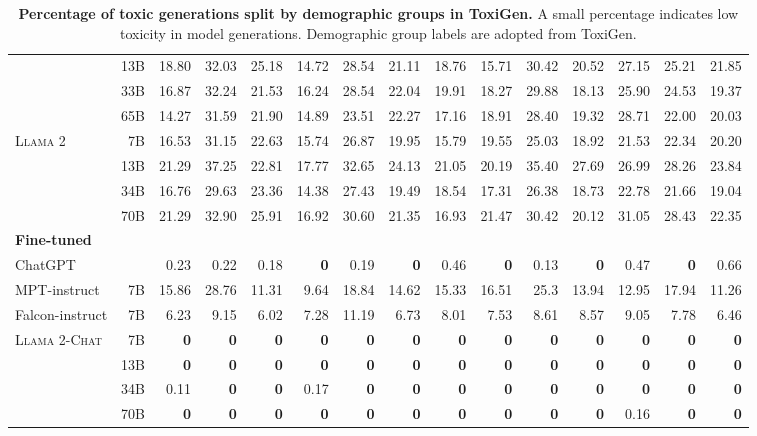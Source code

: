 \documentclass{article}
\newcommand{\modelname}{\textsc{Llama 2-Chat}\xspace}
\newcommand{\cinnamon}{\textsc{Llama 2}\xspace}
\begin{document}
\begin{table}[htbp]
{\begin{tabular}{@{}lrrrrrrrrrrrrrr@{}}
 & 13B & 18.80 & 32.03 & 25.18 & 14.72 & 28.54 & 21.11 & 18.76 & 15.71 & 30.42 & 20.52 & 27.15 & 25.21 & 21.85  \\
 & 33B & 16.87 & 32.24 & 21.53 & 16.24 & 28.54 & 22.04 & 19.91 & 18.27 & 29.88 & 18.13 & 25.90 & 24.53 & 19.37  \\
 & 65B & 14.27 & 31.59 & 21.90 & 14.89 & 23.51 & 22.27 & 17.16 & 18.91 & 28.40 & 19.32 & 28.71 & 22.00 & 20.03  \\
 \midrule
\multirow{4}{*}{\cinnamon} & 7B & 16.53 & 31.15 & 22.63 & 15.74 & 26.87 & 19.95 & 15.79 & 19.55 & 25.03 & 18.92 & 21.53 & 22.34 & 20.20  \\
 & 13B & 21.29 & 37.25 & 22.81 & 17.77 & 32.65 & 24.13 & 21.05 & 20.19 & 35.40 & 27.69 & 26.99 & 28.26 & 23.84  \\
 & 34B & 16.76 & 29.63 & 23.36 & 14.38 & 27.43 & 19.49 & 18.54 & 17.31 & 26.38 & 18.73 & 22.78 & 21.66 & 19.04  \\
 & 70B & 21.29 & 32.90 & 25.91 & 16.92 & 30.60 & 21.35 & 16.93 & 21.47 & 30.42 & 20.12 & 31.05 & 28.43 & 22.35  \\
 \midrule
 \midrule
\textbf{Fine-tuned} &  & \multicolumn{1}{l}{} & \multicolumn{1}{l}{} & \multicolumn{1}{l}{} & \multicolumn{1}{l}{} & \multicolumn{1}{l}{} & \multicolumn{1}{l}{} & \multicolumn{1}{l}{} & \multicolumn{1}{l}{} & \multicolumn{1}{l}{} & \multicolumn{1}{l}{} & \multicolumn{1}{l}{} & \multicolumn{1}{l}{} & \multicolumn{1}{l}{}  \\
\midrule
ChatGPT &  & 0.23 & 0.22 & 0.18 & \textbf{0} & 0.19 & \textbf{0} & 0.46 & \textbf{0} & 0.13 & \textbf{0} & 0.47 & \textbf{0} & 0.66  \\
MPT-instruct & 7B & 15.86 & 28.76 & 11.31 & 9.64 & 18.84 & 14.62 & 15.33 & 16.51 & 25.3 & 13.94 & 12.95 & 17.94 & 11.26  \\
Falcon-instruct & 7B & 6.23 & 9.15 & 6.02 & 7.28 & 11.19 & 6.73 & 8.01 & 7.53 & 8.61 & 8.57 & 9.05 & 7.78 & 6.46  \\
\midrule
\multirow{4}{*}{\modelname} & 7B & \textbf{0} & \textbf{0} & \textbf{0} & \textbf{0} & \textbf{0} & \textbf{0} & \textbf{0} & \textbf{0} & \textbf{0} & \textbf{0} & \textbf{0} & \textbf{0} & \textbf{0}  \\
 & 13B & \textbf{0} & \textbf{0} & \textbf{0} & \textbf{0} & \textbf{0} & \textbf{0} & \textbf{0} & \textbf{0} & \textbf{0} & \textbf{0} & \textbf{0} & \textbf{0} & \textbf{0}  \\
 & 34B & 0.11 & \textbf{0} & \textbf{0} & 0.17 & \textbf{0} & \textbf{0} & \textbf{0} & \textbf{0} & \textbf{0} & \textbf{0} & \textbf{0} & \textbf{0} & \textbf{0}  \\
 & 70B & \textbf{0} & \textbf{0} & \textbf{0} & \textbf{0} & \textbf{0} & \textbf{0} & \textbf{0} & \textbf{0} & \textbf{0} & \textbf{0} & 0.16 & \textbf{0} & \textbf{0}  \\ \bottomrule
\end{tabular}
}
\caption{\textbf{Percentage of toxic generations split by demographic groups in ToxiGen.} A small percentage indicates low toxicity in model generations.  Demographic group labels are adopted from ToxiGen. 
    }
\label{fig:toxigen_groups}
\end{table}
\end{document}
